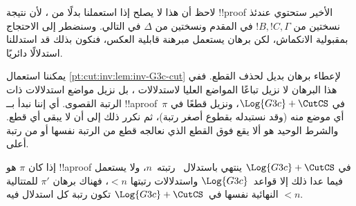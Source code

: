 \documentclass[../../../include/open-logic-section]{subfiles}
\begin{document}
لاحظ أن هذا لا يصلح إذا استعملنا \Cut{} بدلًا من \CutCS، لأن نتيجة
!!{proof} الأخير ستحتوي عندئذ نسختين من $!B, !C, \Gamma$ في المقدم ونسختين
من $\Delta$ في التالي. وسنضطر إلى الاحتجاج بمقبولية الانكماش، لكن برهان
 يستعمل مبرهنة قابلية العكس، فنكون بذلك
قد استدللنا استدلالًا دائريًا.

يمكننا استعمال \cref{pt:cut:inv:lem:inv-G3c-cut} لإعطاء برهان بديل لحذف
القطع. ففي هذا البرهان لا نزيل تباعًا المواضع العليا لاستدلالات \CutCS{}،
بل نزيل مواضع استدلالات \CutCS{} ذات الرتبة القصوى. أي إننا نبدأ بــ
!!a{proof}~$\pi$ في $\Log{G3c} + \CutCS$، ونزيل قطعًا في أي موضع منه
(وقد نستبدله بقطوع أصغر رتبة)، ثم نكرر ذلك إلى أن لا يبقى أي قطع. والشرط
الوحيد هو ألا يقع فوق القطع الذي نعالجه قطع من الرتبة نفسها أو من رتبة أعلى.

\begin{lem} إذا كان $\pi$ هو !!a{proof} في
$\Log{G3c}+\CutCS$ ينتهي باستدلال~\CutCS{} رتبته~$n$، ولا يستعمل فيما عدا
ذلك إلا قواعد~$\Log{G3c}$ واستدلالات \CutCS{} رتبتها $<n$، فهناك برهان
$\pi'$ للمتتالية النهائية نفسها في~$\Log{G3c} + \CutCS$ تكون رتبة كل
استدلال \CutCS{} فيه $<n$.
\end{lem}
\end{document}

